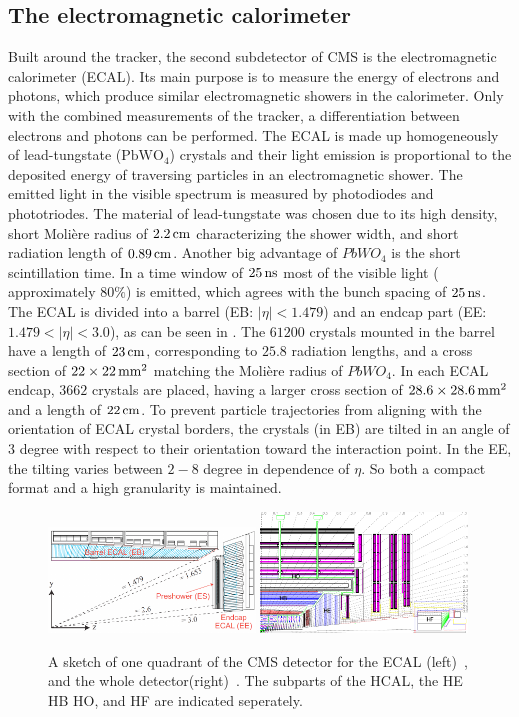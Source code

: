\subsection{The electromagnetic calorimeter}
Built around the tracker, the second subdetector of CMS is the electromagnetic calorimeter (ECAL). Its main purpose is to measure the energy of electrons and photons, which produce similar electromagnetic showers in the calorimeter. Only with the combined measurements of the tracker, a differentiation between electrons and photons can be performed. The ECAL is made up homogeneously of lead-tungstate ($\mathrm{PbWO_4}$) crystals and their light emission is proportional to the deposited energy of traversing particles in an electromagnetic shower. The emitted light in the visible spectrum is measured by photodiodes and phototriodes. The material of lead-tungstate was chosen due to its high density, short Moli\`{e}re radius of $2.2\,\text{cm}$ characterizing the shower width, and short radiation length of $0.89\,\text{cm}$. Another big advantage of $PbWO_4$ is the short scintillation time. In a time window of $25\,\text{ns}$ most of the visible light ( approximately $80\%$) is emitted, which agrees with the bunch spacing of $25\,\text{ns}$. The ECAL is divided into a barrel (EB: $|\eta|<1.479$) and an endcap part (EE: $1.479<|\eta|<3.0$), as can be seen in . The $61200$ crystals mounted in the barrel have a length of $23\,\text{cm}$, corresponding to $25.8$ radiation lengths, and a cross section of $22\times22\,\text{mm}^2$ matching the Moli\`{e}re radius of $PbWO_4$. In each ECAL endcap, $3662$ crystals are placed, having a larger cross section of $ 28.6\times28.6\,\text{mm}^2$ and a length of $22\,\text{cm}$.
To prevent particle trajectories from aligning with the orientation of ECAL crystal borders, the crystals (in EB) are tilted in an angle of $3$ degree with respect to their orientation toward the interaction point. In the EE, the tilting varies between $2-8$ degree in dependence of $\eta$. So both a compact format and a high granularity is maintained.
\begin{figure}[bp]
 \centering
 \includegraphics[width=0.49\textwidth]{figures/general/ecal}
 \includegraphics[width=0.49\textwidth]{figures/general/hcal}
 \caption{A sketch of one quadrant of the CMS detector for the ECAL (left)~\cite{ECALPicture}, and the whole detector(right)~\cite{CMS}. The subparts of the HCAL, the HE HB HO, and HF are indicated seperately.}
 \label{fig:etaPlaneCMS}
\end{figure}
